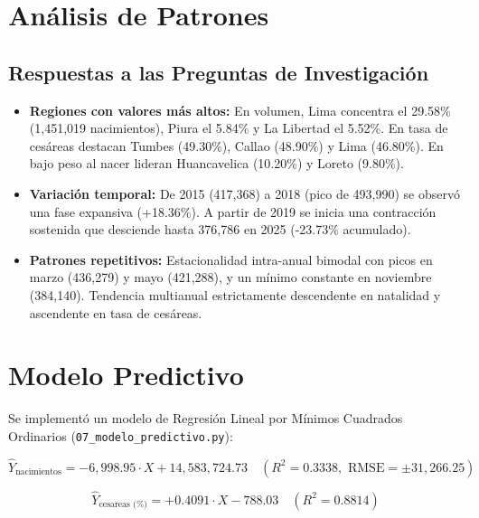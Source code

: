 \documentclass[12pt,a4paper]{article}
\begin{document}
\section{Análisis de Patrones}

\subsection{Respuestas a las Preguntas de Investigación}
\begin{itemize}
    \item \textbf{Regiones con valores más altos:} En volumen, Lima concentra el 29.58\% (1,451,019 nacimientos), Piura el 5.84\% y La Libertad el 5.52\%. En tasa de cesáreas destacan Tumbes (49.30\%), Callao (48.90\%) y Lima (46.80\%). En bajo peso al nacer lideran Huancavelica (10.20\%) y Loreto (9.80\%).
    \item \textbf{Variación temporal:} De 2015 (417,368) a 2018 (pico de 493,990) se observó una fase expansiva (+18.36\%). A partir de 2019 se inicia una contracción sostenida que desciende hasta 376,786 en 2025 (-23.73\% acumulado).
    \item \textbf{Patrones repetitivos:} Estacionalidad intra-anual bimodal con picos en marzo (436,279) y mayo (421,288), y un mínimo constante en noviembre (384,140). Tendencia multianual estrictamente descendente en natalidad y ascendente en tasa de cesáreas.
\end{itemize}

\section{Modelo Predictivo}

Se implementó un modelo de Regresión Lineal por Mínimos Cuadrados Ordinarios (\texttt{07\_modelo\_predictivo.py}):

\begin{equation}
    \hat{Y}_{\text{nacimientos}} = -6,998.95 \cdot X + 14,583,724.73 \quad (R^2 = 0.3338, \text{ RMSE} = \pm 31,266.25)
\end{equation}

\begin{equation}
    \hat{Y}_{\text{cesareas (\%)}} = +0.4091 \cdot X - 788.03 \quad (R^2 = 0.8814)
\end{equation}
\end{document}
